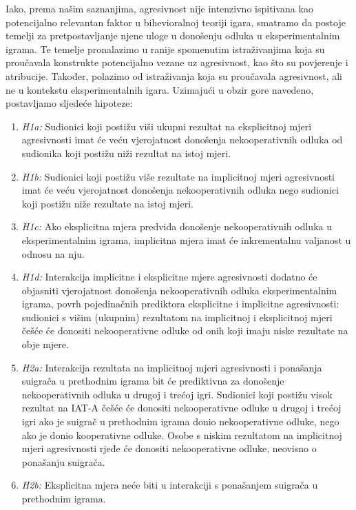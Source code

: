 \documentclass[a4paper, 12pt]{report}
\begin{document}
Iako, prema našim saznanjima, agresivnost nije intenzivno ispitivana kao
potencijalno relevantan faktor u bihevioralnoj teoriji igara, smatramo da
postoje temelji za pretpostavljanje njene uloge u donošenju odluka u
eksperimentalnim igrama. Te temelje pronalazimo u ranije spomenutim
istraživanjima koja su proučavala konstrukte potencijalno vezane uz agresivnost,
kao što su povjerenje i atribucije. Također, polazimo od istraživanja koja su
proučavala agresivnost, ali ne u kontekstu eksperimentalnih igara. Uzimajući u obzir
gore navedeno, postavljamo sljedeće hipoteze:
\begin{enumerate}[label = {}]
        \itemsep0em
        \item \emph{H1a:} Sudionici koji postižu viši ukupni rezultat na eksplicitnoj
            mjeri agresivnosti imat će veću vjerojatnost donošenja nekooperativnih
            odluka od sudionika koji postižu niži rezultat na istoj mjeri.
        \item \emph{H1b:} Sudionici koji postižu više rezultate na implicitnoj
            mjeri agresivnosti imat će veću vjerojatnost donošenja
            nekooperativnih odluka nego sudionici koji postižu niže rezultate na
            istoj mjeri.
        \item \emph{H1c:} Ako eksplicitna mjera predviđa donošenje
            nekooperativnih odluka u eksperimentalnim igrama, implicitna mjera
            imat će inkrementalnu valjanost u odnosu na nju.
        \item \emph{H1d:} Interakcija implicitne i eksplicitne mjere agresivnosti
            dodatno će objasniti vjerojatnost donošenja nekooperativnih odluka
            eksperimentalnim igrama, povrh pojedinačnih prediktora eksplicitne i
            implicitne agresivnosti: sudionici s višim (ukupnim) rezultatom na
            implicitnoj i eksplicitnoj mjeri češće će donositi nekooperativne
            odluke od onih koji imaju niske rezultate na obje mjere. 
        \item \emph{H2a:} Interakcija rezultata na implicitnoj mjeri agresivnosti
            i ponašanja suigrača u prethodnim igrama bit će prediktivna za
            donošenje nekooperativnih odluka u drugoj i trećoj igri. Sudionici koji postižu visok
            rezultat na IAT-A češće će donositi nekooperativne odluke u drugoj i
            trećoj igri ako je
            suigrač u prethodnim igrama donio nekooperativne odluke, nego ako je
            donio kooperativne odluke. Osobe s niskim rezultatom na implicitnoj
            mjeri agresivnosti
            rjeđe će donositi nekooperativne odluke, neovisno o ponašanju
            suigrača. 
        \item \emph{H2b:} Eksplicitna mjera neće biti u interakciji s ponašanjem
            suigrača u prethodnim igrama.
    \end{enumerate}
\end{document}
